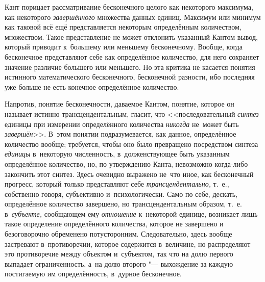 Кант порицает рассматривание бесконечного целого как некоторого максимума, как
некоторого {\em завершённого} множества данных единиц. Максимум или минимум как
таковой всё ещё представляется некоторым определённым количеством, множеством.
Такое представление не может отклонить указанный Кантом вывод, который приводит
к~большему или меньшему бесконечному. Вообще, когда бесконечное представляют
себе как определённое количество, для него сохраняет значение различие большего
или меньшего. Но эта критика не касается понятия истинного математического
бесконечного, бесконечной разности, ибо последняя уже больше не есть конечное
определённое количество.

Напротив, понятие бесконечности, даваемое Кантом, понятие, которое он называет
истинно трансцендентальным, гласит, что <<последовательный {\em синтез} единицы
при измерении определённого количества {\em никогда} не~может быть
{\em завершён}>>. В~этом понятии подразумевается, как данное, определённое
количество вообще; требуется, чтобы оно было превращено посредством синтеза
{\em единицы} в~некоторую численность, в~долженствующее быть указанным
определённое количество, но, по утверждению Канта, невозможно когда-либо
закончить этот синтез. Здесь очевидно выражено не~что иное, как бесконечный
прогресс, который только представляют себе {\em трансцендентально,} т.~е.,
собственно говоря, субъективно и~психологически. Само по себе, дескать,
определённое количество завершено, но трансцендентальным образом, т.~е.
в~{\em субъекте,} сообщающем ему {\em отношение} к~некоторой единице, возникает
лишь такое определение определённого количества, которое не завершено и
безоговорочно обременено потусторонним. Следовательно, здесь вообще застревают
в~противоречии, которое содержится в~величине, но распределяют это противоречие
между объектом и~субъектом, так что на долю первого выпадает ограниченность,
а~на долю второго "--- выхождение за каждую постигаемую им
определённость, в~дурное бесконечное.

